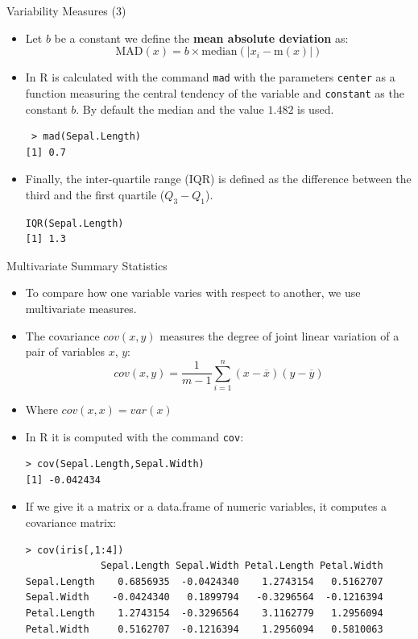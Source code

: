 \documentclass[handout]{beamer}
\begin{document}
\begin{frame}[fragile]{Variability Measures (3)}
\scriptsize{ 
\begin{itemize}
 \item Let $b$ be a constant we define the \textbf{mean absolute deviation} as: 
 \begin{displaymath}
  \text{MAD}(x) = b \times \text{median}(|x_{i}-\text{m}(x)|)
 \end{displaymath}
 \item In R is calculated with the command \verb+mad+ with the parameters \verb+center+ as a function measuring the central tendency of the variable and \verb+constant+ as the constant $b$. By default the median and the value $1.482$ is used. 
 \begin{verbatim}
 > mad(Sepal.Length)
[1] 0.7 
 \end{verbatim}

 \item Finally, the inter-quartile range (IQR) is defined as the difference between the third and the first quartile ($Q_3 - Q_1$).
 \begin{verbatim}
IQR(Sepal.Length)
[1] 1.3  
 \end{verbatim}

\end{itemize}
  
} 
\end{frame}



\begin{frame}[fragile]{Multivariate Summary Statistics}
\scriptsize{
\begin{itemize}
 \item To compare how one variable varies with respect to another, we use multivariate measures.
 \item The covariance $cov(x,y)$ measures the degree of joint linear variation of a pair of variables $x$, $y$:
 \begin{displaymath}
  cov(x,y)=\frac{1}{m-1}\sum_{i=1}^{n}(x-\overline{x})(y-\overline{y})
 \end{displaymath}
 \item Where $cov(x,x)=var(x)$
\item In R it is computed with the command  \verb+cov+:
\begin{verbatim}
> cov(Sepal.Length,Sepal.Width)
[1] -0.042434 
\end{verbatim}
\item If we give it a matrix or a data.frame of numeric variables, it computes a covariance matrix:
\begin{verbatim}
> cov(iris[,1:4])
             Sepal.Length Sepal.Width Petal.Length Petal.Width
Sepal.Length    0.6856935  -0.0424340    1.2743154   0.5162707
Sepal.Width    -0.0424340   0.1899794   -0.3296564  -0.1216394
Petal.Length    1.2743154  -0.3296564    3.1162779   1.2956094
Petal.Width     0.5162707  -0.1216394    1.2956094   0.5810063 
\end{verbatim}

 
 
 
\end{itemize}



}
\end{frame}
\end{document}
